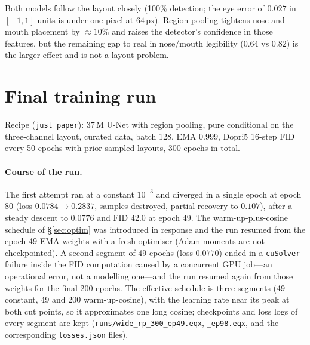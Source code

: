 \documentclass[11pt]{article}
\begin{document}
Both models follow the layout closely (100\% detection; the eye error of $0.027$ in
$[-1,1]$ units is under one pixel at $64$\,px). Region pooling tightens nose and mouth
placement by $\approx10\%$ and raises the detector's confidence in those features, but
the remaining gap to real in nose/mouth legibility ($0.64$ vs $0.82$) is the larger
effect and is not a layout problem.

\section{Final training run}\label{sec:final}

Recipe (\texttt{just paper}): $37$\,M U-Net with region pooling, pure conditional on the
three-channel layout, curated data, batch 128, EMA $0.999$, Dopri5 16-step FID every 50
epochs with prior-sampled layouts, 300 epochs in total.

\paragraph{Course of the run.} The first attempt ran at a constant $10^{-3}$ and
diverged in a single epoch at epoch 80 (loss $0.0784\to0.2837$, samples destroyed,
partial recovery to $0.107$), after a steady descent to $0.0776$ and FID $42.0$ at epoch
49. The warm-up-plus-cosine schedule of \S\ref{sec:optim} was introduced in response and
the run resumed from the epoch-49 EMA weights with a fresh optimiser (Adam moments are
not checkpointed). A second segment of 49 epochs (loss $0.0770$) ended in a
\texttt{cuSolver} failure inside the FID computation caused by a concurrent GPU job---an
operational error, not a modelling one---and the run resumed again from those weights
for the final 200 epochs. The effective schedule is three segments (49 constant, 49 and
200 warm-up-cosine), with the learning rate near its peak at both cut points, so it
approximates one long cosine; checkpoints and loss logs of every segment are kept
(\texttt{runs/wide\_rp\_300\_ep49.eqx}, \texttt{\_ep98.eqx}, and the corresponding
\texttt{losses.json} files).
\end{document}
